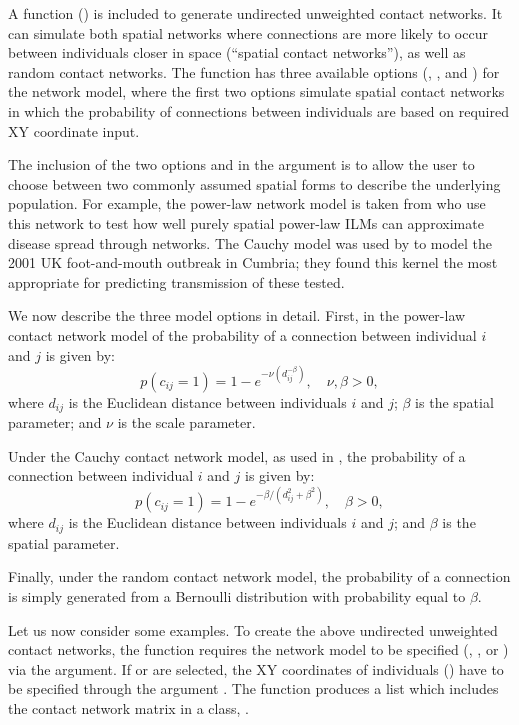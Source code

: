 \documentclass[nojss,shortnames]{jss}
\begin{document}
A function () is included to generate undirected unweighted contact networks. It can simulate both spatial networks where connections are more likely to occur between individuals closer in space (``spatial contact networks''), as well as random contact networks. 
The function  has three available options (, , and ) for the network model, where the first two options simulate spatial contact networks in which the probability of connections between individuals are based on required XY coordinate input. 

The inclusion of the two options  and  in the argument  is to allow the user to choose between two commonly assumed spatial forms to describe the underlying population.
For example, the power-law network model is taken from \citet{bifolchi2013spatial} who use this network to test how well purely spatial power-law ILMs can approximate disease spread through networks.  The Cauchy model was used by \citet{jewell2009bayesian} to model the 2001 UK foot-and-mouth outbreak in Cumbria; they found this kernel the most appropriate for predicting transmission of these tested. 

We now describe the three model options in detail. First, in the power-law contact network model of \citet{bifolchi2013spatial} the probability of a connection between individual $i$ and $j$ is given by: 
\[ p(c_{ij}=1) = 1- e^{-\nu(d_{ij}^{-\beta})}, \quad  \nu,\beta > 0, \]
\noindent where $d_{ij}$ is the Euclidean distance between individuals $i$ and $j$;  $\beta$ is the spatial parameter; and $\nu$ is the scale parameter. 

Under the Cauchy contact network model, as used in \citet{jewell2009bayesian}, the probability of a connection between individual $i$ and $j$ is given by:
\[ p(c_{ij}=1) = 1- e^{-\beta/(d_{ij}^{2} + \beta^{2})} , \quad \beta > 0, \]
\noindent where $d_{ij}$ is the Euclidean distance between individuals $i$ and $j$; and $\beta$ is the spatial parameter.

Finally, under the random contact network model, the probability of a connection is simply generated from a Bernoulli distribution with probability equal to $\beta$.

Let us now consider some examples. To create the above undirected unweighted contact networks, the function requires the network model to be specified (, , or ) via the  argument. If  or  are selected, the XY coordinates of individuals () have to be specified through the argument . 
The function  produces a list which includes the contact network matrix in a class, .
\end{document}
